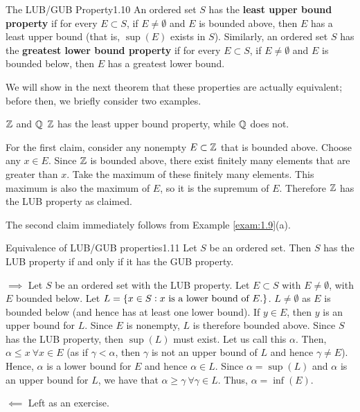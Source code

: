 \begin{definition}{The LUB/GUB Property}{1.10}
    An ordered set $S$ has the \textbf{least upper bound property} if for every $E \subset S$, if $E \neq \emptyset$ and $E$ is bounded above, then $E$ has a least upper bound (that is, $\sup(E)$ exists in $S$). Similarly, an ordered set $S$ has the \textbf{greatest lower bound property} if for every $E \subset S$, if $E \neq \emptyset$ and $E$ is bounded below, then $E$ has a greatest lower bound.
\end{definition}
We will show in the next theorem that these properties are actually equivalent; before then, we briefly consider two examples.
\begin{nexample}{$\mathbb{Z}$ and $\mathbb{Q}$}
    $\mathbb{Z}$ has the least upper bound property, while $\mathbb{Q}$ does not. 
\end{nexample}
\begin{nproof}
    For the first claim, consider any nonempty $E \subset \mathbb{Z}$ that is bounded above. Choose any $x \in E$. Since $\mathbb{Z}$ is bounded above, there exist finitely many elements that are greater than $x$. Take the maximum of these finitely many elements. This maximum is also the maximum of $E$, so it is the supremum of $E$. Therefore $\mathbb{Z}$ has the LUB property as claimed.
    
    The second claim immediately follows from Example \ref{exam:1.9}(a). 
\end{nproof}

\begin{theorem}{Equivalence of LUB/GUB properties}{1.11}
    Let $S$ be an ordered set. Then $S$ has the LUB property if and only if it has the GUB property. 
\end{theorem}
\begin{nproof}
    $\boxed{\implies}$ Let $S$ be an ordered set with the LUB property. Let $E \subset S$ with $E \neq \emptyset$, with $E$ bounded below. Let $L = \set{x \in S: x\text{ is a lower bound of $E$.}}$. $L \neq \emptyset$ as $E$ is bounded below (and hence has at least one lower bound). If $y \in E$, then $y$ is an upper bound for $L$. Since $E$ is nonempty, $L$ is therefore bounded above. Since $S$ has the LUB property, then $\sup(L)$ must exist. Let us call this $\alpha$. Then, $\alpha \leq x\ \forall x \in E$ (as if $\gamma < \alpha$, then $\gamma$ is not an upper bound of $L$ and hence $\gamma \neq E$). Hence, $\alpha$ is a lower bound for $E$ and hence $\alpha \in L$. Since $\alpha = \sup(L)$ and $\alpha$ is an upper bound for $L$, we have that $\alpha \geq \gamma\ \forall \gamma \in L$. Thus, $\alpha = \inf(E)$. 

    $\boxed{\impliedby}$ Left as an exercise. 
\end{nproof}

